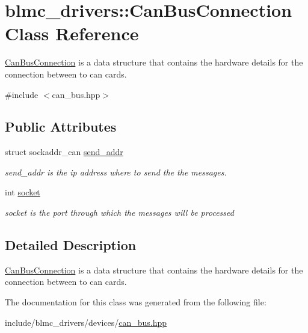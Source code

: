 \hypertarget{classblmc__drivers_1_1CanBusConnection}{}\section{blmc\+\_\+drivers\+:\+:Can\+Bus\+Connection Class Reference}
\label{classblmc__drivers_1_1CanBusConnection}


\hyperlink{classblmc__drivers_1_1CanBusConnection}{Can\+Bus\+Connection} is a data structure that contains the hardware details for the connection between to can cards.  




{\ttfamily \#include $<$can\+\_\+bus.\+hpp$>$}

\subsection*{Public Attributes}
\begin{DoxyCompactItemize}
\item 
\mbox{\label{classblmc__drivers_1_1CanBusConnection_a9f9e0f2d59955798cfd66ed295b76797}} 
struct sockaddr\+\_\+can \hyperlink{classblmc__drivers_1_1CanBusConnection_a9f9e0f2d59955798cfd66ed295b76797}{send\+\_\+addr}
\begin{DoxyCompactList}\small\item\em send\+\_\+addr is the ip address where to send the the messages. \end{DoxyCompactList}\item 
\mbox{\label{classblmc__drivers_1_1CanBusConnection_a864cc55d83145a1a54310ef5271f67ea}} 
int \hyperlink{classblmc__drivers_1_1CanBusConnection_a864cc55d83145a1a54310ef5271f67ea}{socket}
\begin{DoxyCompactList}\small\item\em socket is the port through which the messages will be processed \end{DoxyCompactList}\end{DoxyCompactItemize}


\subsection{Detailed Description}
\hyperlink{classblmc__drivers_1_1CanBusConnection}{Can\+Bus\+Connection} is a data structure that contains the hardware details for the connection between to can cards. 

The documentation for this class was generated from the following file\+:\begin{DoxyCompactItemize}
\item 
include/blmc\+\_\+drivers/devices/\hyperlink{can__bus_8hpp}{can\+\_\+bus.\+hpp}\end{DoxyCompactItemize}
